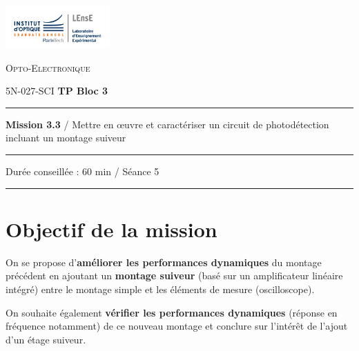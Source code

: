 \newpage
\pagestyle{empty}

\begin{minipage}[c]{.25\linewidth}
	\includegraphics[width=4cm]{images/Logo-LEnsE.png}
\end{minipage} \hfill
\begin{minipage}[c]{.4\linewidth}

\begin{center}
\vspace{0.3cm}
{\Large \textsc{Opto-Electronique}}

\medskip

5N-027-SCI \qquad \textbf{\Large TP Bloc 3}

\end{center}
\end{minipage}\hfill

\vspace{0.5cm}

\noindent \rule{\linewidth}{1pt}

{\noindent\Large \textbf{Mission 3.3} / Mettre en \oe{}uvre et caractériser un circuit de photodétection incluant un montage suiveur} 

\vspace{-0.5cm}

\begin{center}
\noindent \rule{\linewidth}{1pt}

Durée conseillée : 60 min / Séance 5

\vspace{-0.2cm}
\noindent \rule{\linewidth}{1pt}
\end{center}

\section{Objectif de la mission}
\label{mission33}

On se propose d'\textbf{améliorer les performances dynamiques} du montage précédent en ajoutant un \textbf{montage suiveur} (basé sur un amplificateur linéaire intégré) entre le montage simple et les éléments de mesure (oscilloscope).

On souhaite également \textbf{vérifier les performances dynamiques} (réponse en fréquence notamment) de ce nouveau montage et conclure sur l'intérêt de l'ajout d'un étage suiveur.

